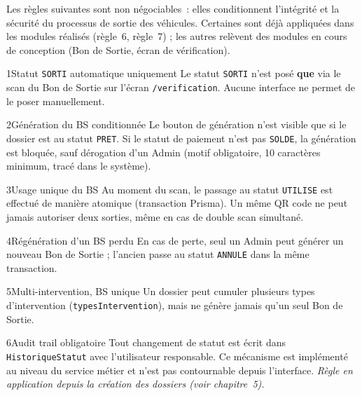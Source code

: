 \documentclass[11pt,a4paper]{report}
\begin{document}
Les règles suivantes sont non négociables~: elles conditionnent l'intégrité et la
sécurité du processus de sortie des véhicules. Certaines sont déjà appliquées dans les
modules réalisés (règle~6, règle~7) ; les autres relèvent des modules en cours de
conception (Bon de Sortie, écran de vérification).

\begin{regle}{1}{Statut \texttt{SORTI} automatique uniquement}
Le statut \texttt{SORTI} n'est posé \textbf{que} via le scan du Bon de Sortie sur l'écran
\texttt{/verification}. Aucune interface ne permet de le poser manuellement.
\end{regle}

\begin{regle}{2}{Génération du BS conditionnée}
Le bouton de génération n'est visible que si le dossier est au statut \texttt{PRET}.
Si le statut de paiement n'est pas \texttt{SOLDE}, la génération est bloquée, sauf
dérogation d'un Admin (motif obligatoire, 10 caractères minimum, tracé dans le système).
\end{regle}

\begin{regle}{3}{Usage unique du BS}
Au moment du scan, le passage au statut \texttt{UTILISE} est effectué de manière atomique
(transaction Prisma). Un même QR code ne peut jamais autoriser deux sorties, même en cas
de double scan simultané.
\end{regle}

\begin{regle}{4}{Régénération d'un BS perdu}
En cas de perte, seul un Admin peut générer un nouveau Bon de Sortie ; l'ancien passe au
statut \texttt{ANNULE} dans la même transaction.
\end{regle}

\begin{regle}{5}{Multi-intervention, BS unique}
Un dossier peut cumuler plusieurs types d'intervention (\texttt{typesIntervention}), mais
ne génère jamais qu'un seul Bon de Sortie.
\end{regle}

\begin{regle}{6}{Audit trail obligatoire}
Tout changement de statut est écrit dans \texttt{HistoriqueStatut} avec l'utilisateur
responsable. Ce mécanisme est implémenté au niveau du service métier et n'est pas
contournable depuis l'interface. \emph{Règle en application depuis la création des
dossiers (voir chapitre~5).}
\end{regle}
\end{document}
